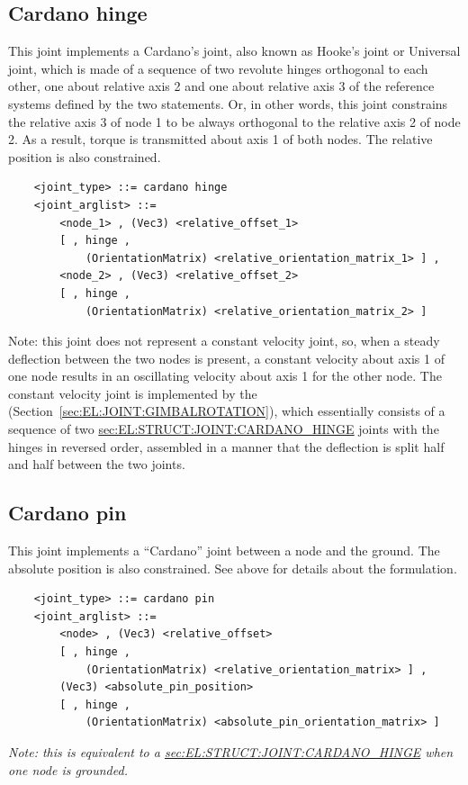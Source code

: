 \subsection{Cardano hinge}
\label{sec:EL:STRUCT:JOINT:CARDANO_HINGE}
This joint implements a Cardano's joint, also known as Hooke's joint
or Universal joint, which is made of a sequence
of two revolute hinges orthogonal to each other, one about relative axis 2
and one about relative axis 3 of the reference systems
defined by the two  statements.
Or, in other words, this joint constrains the relative axis 3 of node 1 
to be always orthogonal to the relative axis 2 of node 2.
As a result, torque is transmitted about axis 1 of both nodes.
The relative position is also constrained.
\begin{verbatim}
    <joint_type> ::= cardano hinge
    <joint_arglist> ::= 
        <node_1> , (Vec3) <relative_offset_1> 
        [ , hinge , 
            (OrientationMatrix) <relative_orientation_matrix_1> ] ,
        <node_2> , (Vec3) <relative_offset_2>
        [ , hinge , 
            (OrientationMatrix) <relative_orientation_matrix_2> ]
\end{verbatim}
Note: this joint does not represent a constant velocity joint,
so, when a steady deflection between the two nodes is present,
a constant velocity about axis 1 of one node results in an oscillating
velocity about axis 1 for the other node.
The constant velocity joint is implemented by the 
(Section~\ref{sec:EL:JOINT:GIMBALROTATION}), which essentially consists
of a sequence of two
\hyperref{\kw{cardano hinge}}{\kw{cardano hinge} (see Section~}{)}{sec:EL:STRUCT:JOINT:CARDANO_HINGE}
joints with the hinges in reversed order, assembled
in a manner that the deflection is split half and half
between the two joints.

\subsection{Cardano pin}
\label{sec:EL:STRUCT:JOINT:CARDANO_PIN}
This joint implements a ``Cardano'' joint between a node and the ground.
The absolute position is also constrained.
See above for details about the formulation.
\begin{verbatim}
    <joint_type> ::= cardano pin
    <joint_arglist> ::= 
        <node> , (Vec3) <relative_offset>
        [ , hinge , 
            (OrientationMatrix) <relative_orientation_matrix> ] ,
        (Vec3) <absolute_pin_position>
        [ , hinge , 
            (OrientationMatrix) <absolute_pin_orientation_matrix> ]
\end{verbatim}
\emph{Note: this is equivalent to a
\hyperref{\kw{cardano hinge}}{\kw{cardano hinge} (see Section~}{)}{sec:EL:STRUCT:JOINT:CARDANO_HINGE}
when one node is grounded.
}

